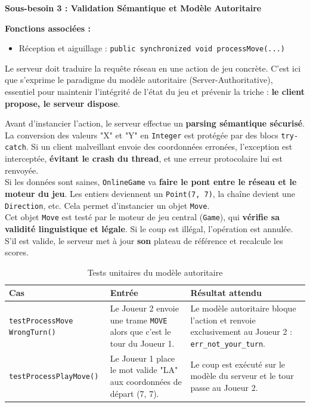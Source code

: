 \documentclass[a4paper]{article}
\begin{document}
\begin{besoinbox}
    \textbf{\large Sous-besoin 3 : Validation Sémantique et Modèle Autoritaire}
    
    \vspace{2mm}
    \textbf{Fonctions associées :}
    \begin{itemize}
        \item Réception et aiguillage : \texttt{public synchronized void processMove(...)}
    \end{itemize}
    \vspace{2mm}

    Le serveur doit traduire la requête réseau en une action de jeu concrète. C'est ici que s'exprime le paradigme du modèle autoritaire (Server-Authoritative), essentiel pour maintenir l'intégrité de l'état du jeu et prévenir la triche \textbf{\cite{smed2002aspects}} : \textbf{le client propose, le serveur dispose}.

    Avant d'instancier l'action, le serveur effectue un \textbf{parsing sémantique sécurisé}. La conversion des valeurs "X" et "Y" en \texttt{Integer} est protégée par des blocs \texttt{try-catch}. Si un client malveillant envoie des coordonnées erronées, l'exception est interceptée, \textbf{évitant le crash du thread}, et une erreur protocolaire lui est renvoyée.\\

    Si les données sont saines, \texttt{OnlineGame} va \textbf{faire le pont entre le réseau et le moteur du jeu}. Les entiers deviennent un \texttt{Point(7, 7)}, la chaîne devient une \texttt{Direction}, etc. Cela permet d'instancier un objet \texttt{Move}.\\

    Cet objet \texttt{Move} est testé par le moteur de jeu central (\texttt{Game}), qui \textbf{vérifie sa validité linguistique et légale}. Si le coup est illégal, l'opération est annulée. S'il est valide, le serveur met à jour \textbf{son} plateau de référence et recalcule les scores.
\end{besoinbox}

\begin{table}[H]
    \centering
    \small
    \begin{tabular}{p{4.5cm} p{4.5cm} p{5.5cm}}
        \toprule
        \textbf{Cas} & \textbf{Entrée} & \textbf{Résultat attendu} \\
        \midrule
        \texttt{testProcessMove WrongTurn()} & Le Joueur 2 envoie une trame \texttt{MOVE} alors que c'est le tour du Joueur 1. & Le modèle autoritaire bloque l'action et renvoie exclusivement au Joueur 2 : \texttt{err\_not\_your\_turn}. \\
        \midrule
        \texttt{testProcessPlayMove()} & Le Joueur 1 place le mot valide "LA" aux coordonnées de départ (7, 7). & Le coup est exécuté sur le modèle du serveur et le tour passe au Joueur 2. \\
        \bottomrule
    \end{tabular}
    \caption{Tests unitaires du modèle autoritaire}
\end{table}
\end{document}
